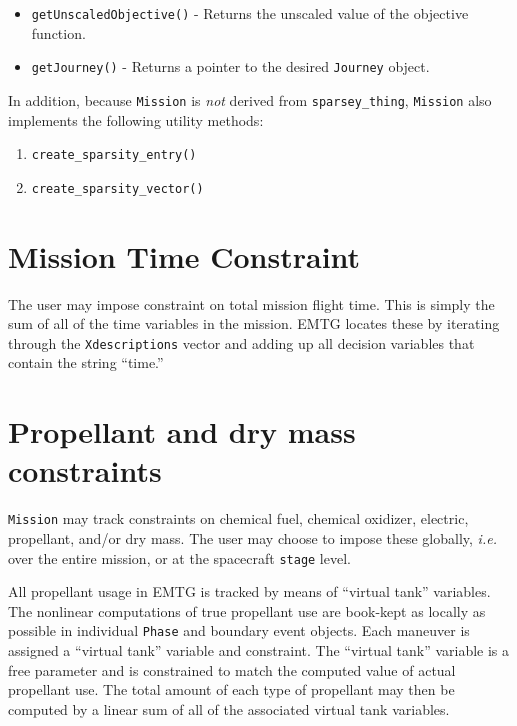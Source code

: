 \begin{itemize}
	\item \texttt{getUnscaledObjective()} - Returns the unscaled value of the objective function.
	\item \texttt{getJourney()} - Returns a pointer to the desired \texttt{Journey} object.
\end{itemize}

In addition, because \texttt{Mission} is \textit{not} derived from \texttt{sparsey\_thing}, \texttt{Mission} also implements the following utility methods:

\begin{enumerate}
	\item \texttt{create\_sparsity\_entry()}
	\item \texttt{create\_sparsity\_vector()}
\end{enumerate}

\section{Mission Time Constraint}
\label{sec:mission_time_constraint}

The user may impose constraint on total mission flight time. This is simply the sum of all of the time variables in the mission. \ac{EMTG} locates these by iterating through the \texttt{Xdescriptions} vector and adding up all decision variables that contain the string ``time.''

\section{Propellant and dry mass constraints}
\label{sec:propellant_and_dry_mass_constraints}

\texttt{Mission} may track constraints on chemical fuel, chemical oxidizer, electric, propellant, and/or dry mass. The user may choose to impose these globally, \textit{i.e.} over the entire mission, or at the spacecraft \texttt{stage} level.

All propellant usage in \ac{EMTG} is tracked by means of ``virtual tank'' variables. The nonlinear computations of true propellant use are book-kept as locally as possible in individual \texttt{Phase} and boundary event objects. Each maneuver is assigned a ``virtual tank'' variable and constraint. The ``virtual tank'' variable is a free parameter and is constrained to match the computed value of actual propellant use. The total amount of each type of propellant may then be computed by a linear sum of all of the associated virtual tank variables.

